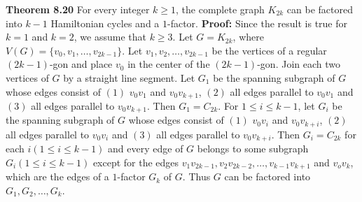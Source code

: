 \nopagenumbers
{\bf Theorem 8.20}
\vskip 6pt
For every integer $k \geq 1$, the complete graph $K_{2k}$ can be factored into $k-1$ Hamiltonian cycles and a $1$-factor.
\vskip 10pt
{\bf Proof:}
\vskip 6pt
Since the result is true for $k=1$ and $k=2$, we assume that $k \geq 3$. Let $G=K_{2k}$, where $V(G)= \lbrace v_0,v_1, \ldots , v_{2k-1} \rbrace$. Let $v_1,v_2, \ldots , v_{2k-1}$ be the vertices of a regular $(2k-1)$-gon and place $v_0$ in the center of the $(2k-1)$-gon. Join each two vertices of $G$ by a straight line segment. Let $G_1$ be the spanning subgraph of $G$ whose edges consist of $(1)$ $v_0v_1$ and $v_0v_{k+1}$, $(2)$ all edges parallel to $v_0v_1$ and $(3)$ all edges parallel to $v_0v_{k+1}$. Then $G_1=C_{2k}$. For $1 \leq i \leq k-1$, let $G_i$ be the spanning subgraph of $G$ whose edges consist of $(1)$ $v_0v_i$ and $v_0v_{k+i}$, $(2)$ all edges parallel to $v_0v_i$ and $(3)$ all edges parallel to $v_0v_{k+i}$. Then $G_i=C_{2k}$ for each $i(1 \leq i \leq k-1)$ and every edge of $G$ belongs to some subgraph $G_i(1 \leq i \leq k-1)$ except for the edges $v_1v_{2k-1},v_2v_{2k-2}, \ldots , v_{k-1}v_{k+1}$ and $v_ov_k$, which are the edges of a $1$-factor $G_k$ of $G$. Thus $G$ can be factored into $G_1,G_2, \ldots , G_k$.

\vfill\eject
